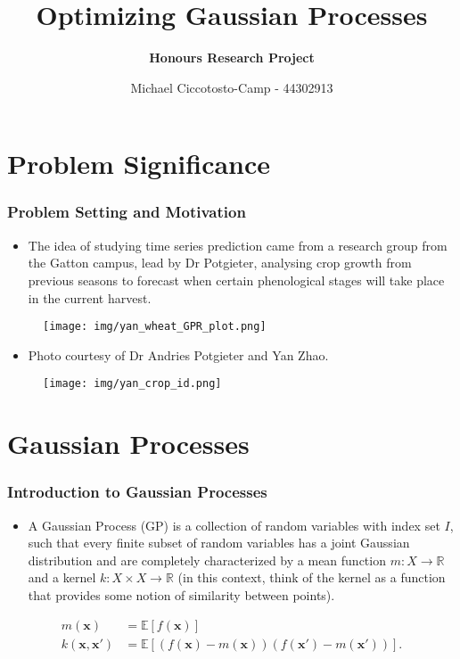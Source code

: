 \documentclass[9pt,hyperref={pdfpagelabels=false},xcolor=table]{beamer}
\title{Optimizing Gaussian Processes}
\author[Michael Ciccotosto-Camp]{{\bf Honours Research Project}}
\date{
Michael Ciccotosto-Camp - 44302913 \\
}
\begin{document}
\maketitle

\section{Problem Significance}

\begin{frame}
    \frametitle{Problem Setting and Motivation}
    \begin{itemize}
        \item The idea of studying time series prediction came from a research group from the Gatton campus, lead by Dr Potgieter, analysing crop growth from previous seasons to forecast when certain phenological stages will take place in the current harvest.
    \end{itemize}
    \begin{figure}
        \centering
        \texttt{[image: img/yan\_wheat\_GPR\_plot.png]}
    \end{figure}
\end{frame}

\begin{frame}
    \begin{itemize}
        \item Photo courtesy of Dr Andries Potgieter and Yan Zhao.
    \end{itemize}
    \begin{figure}
        \centering
        \texttt{[image: img/yan\_crop\_id.png]}
    \end{figure}
\end{frame}

\section{Gaussian Processes}

\begin{frame}
    \frametitle{Introduction to Gaussian Processes}
    \begin{itemize}
        \item A Gaussian Process (GP) is a collection of random variables with index set $I$, such that every finite subset of random variables has a joint Gaussian distribution and are completely characterized by a mean function $m : X \to \mathbb{R}$ and a kernel $k : X \times X \to \mathbb{R}$ (in this context, think of the kernel as a function that provides some notion of similarity between points).
    \end{itemize}
    \begin{align*}
        m(\bm{x})           & = \mathbb{E} \left[ f(\bm{x}) \right]                                          \\
        k (\bm{x}, \bm{x'}) & = \mathbb{E} \left[ (f(\bm{x}) - m(\bm{x})) (f(\bm{x'}) - m(\bm{x'})) \right].
    \end{align*}
\end{frame}
\end{document}
